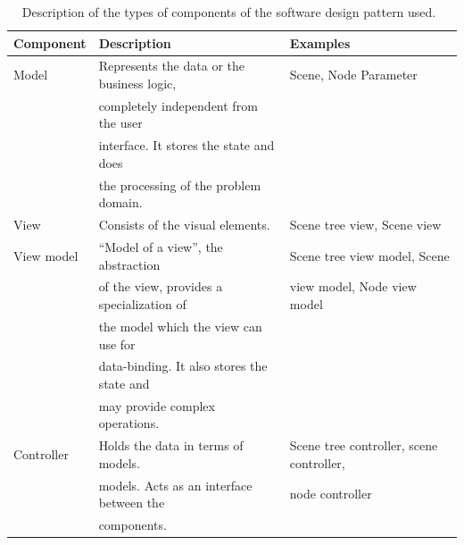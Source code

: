 \documentclass[%
    a4paper,    %
    justified,  %
    nobib,      %
    openany     %
]{tufte-book}
\makeatletter
\renewcommand{\label}[1]{\@tufte@label{##1}}%
\makeatother
\begin{document}
\begin{table}[h]
  \begin{tabularx}{\textwidth}{llX}
    \toprule
    \textbf{Component} & \textbf{Description} & \textbf{Examples} \\
    \midrule
    Model      & Represents the data or the business logic, & Scene, Node
                                                              Parameter\\
               & completely independent from the user       & \\
               & interface. It stores the state and does    & \\
               & the processing of the problem domain.      & \\
    \midrule
    View       & Consists of the visual elements.           & Scene tree view,
                                                              Scene view\\
    \midrule
    View model & \enquote{Model of a view}, the abstraction & Scene tree view
                                                              model, Scene\\
               & of the view, provides a specialization of  & view model, Node
                                                              view model\\
               & the model which the view can use for       & \\
               & data-binding. It also stores the state and & \\
               & may provide complex operations.            & \\
    \midrule
    Controller & Holds the data in terms of models.         & Scene tree
                                                              controller, scene
                                                              controller,\\
               & models. Acts as an interface between the   & node controller\\
               & components.                                & \\
    \bottomrule
  \end{tabularx}
  \caption{Description of the types of components of the software design
    pattern used.~\cite{fowler-presentation-2004, gossman-mvvm-2005}}
\label{table:software-design-pattern-components}
\end{table}

\vspace{5mm}
  
\end{document}
